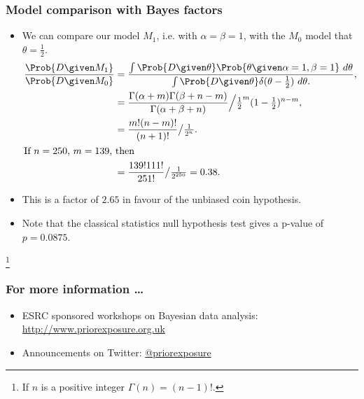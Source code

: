\documentclass{slides}
\begin{document}
\begin{frame}
	\frametitle{Model comparison with Bayes factors}
	\begin{itemize}
		\item We can compare our model $M_1$, i.e. with $\alpha = \beta = 1$, with the $M_0$ model that $\theta = \frac{1}{2}$.
			\begin{align*}
				\frac{\Prob{D\given M_1}}{\Prob{D\given M_0}} &= \frac{
				\int\Prob{D\given\theta}\Prob{\theta\given\alpha=1,\beta=1}\ d\theta 
				}{
					\int\Prob{D\given\theta} \delta(\theta-\frac{1}{2})\ d\theta.
				},\\
				&= \frac{\Gamma(\alpha+m)\Gamma(\beta+n-m)}{\Gamma(\alpha+\beta+n)} \Big/ \tfrac{1}{2}^m (1-\tfrac{1}{2})^{n-m},\\
				&= \frac{m!(n-m)!}{(n+1)!} \big/ \tfrac{1}{2^n}.\\
				\intertext{If $n=250$, $m=139$, then}
				&= \frac{139!111!}{251!} \big/ \tfrac{1}{2^{250}} = 0.38.
			\end{align*}
		\item This is a factor of $2.65$ in favour of the unbiased coin hypothesis.
		\item Note that the classical statistics null hypothesis test gives a p-value of $p=0.0875$.
	\end{itemize}
	\let\thefootnote\relax\footnote{If $n$ is a positive integer $\Gamma(n) = (n-1)!$.}
	\end{frame}
\begin{frame}
	\frametitle{For more information \ldots}
	\begin{itemize}
	\item ESRC sponsored workshops on Bayesian data analysis:
		\url{http://www.priorexposure.org.uk}
	\item Announcements on Twitter: \faTwitter \href{https://twitter.com/priorexposure}{@priorexposure}
	\end{itemize}
\end{frame}
\end{document}
